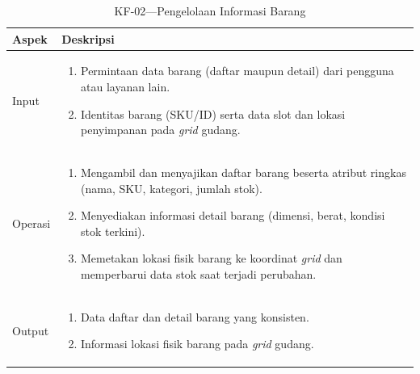 \begin{xltabular}{\textwidth}{ | l | X | }
  \caption{KF-02---Pengelolaan Informasi Barang} \label{tab:kf02} \\
  \hline
  \textbf{Aspek} & \textbf{Deskripsi} \\
  \hline
  \endfirsthead
  \hline
  \endfoot
  Input &
  \begin{enumerate}[leftmargin=*,nosep]
    \item Permintaan data barang (daftar maupun detail) dari pengguna atau layanan lain.
    \item Identitas barang (SKU/ID) serta data slot dan lokasi penyimpanan pada \textit{grid} gudang.
  \end{enumerate} \\
  \hline
  Operasi &
  \begin{enumerate}[leftmargin=*,nosep]
    \item Mengambil dan menyajikan daftar barang beserta atribut ringkas (nama, SKU, kategori, jumlah stok).
    \item Menyediakan informasi detail barang (dimensi, berat, kondisi stok terkini).
    \item Memetakan lokasi fisik barang ke koordinat \textit{grid} dan memperbarui data stok saat terjadi perubahan.
  \end{enumerate} \\
  \hline
  Output &
  \begin{enumerate}[leftmargin=*,nosep]
    \item Data daftar dan detail barang yang konsisten.
    \item Informasi lokasi fisik barang pada \textit{grid} gudang.
  \end{enumerate} \\
  \hline
\end{xltabular}

